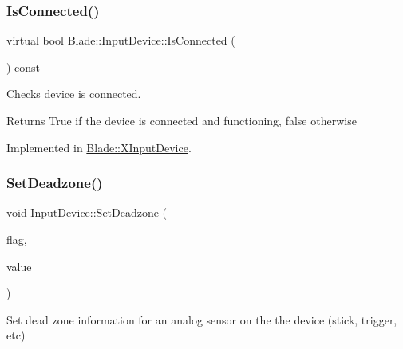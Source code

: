 \mbox{\label{class_blade_1_1_input_device_aa9cc6d93af07d3fb28db79f663752c4c}} 
\subsubsection{\texorpdfstring{Is\+Connected()}{IsConnected()}}
{\footnotesize\ttfamily virtual bool Blade\+::\+Input\+Device\+::\+Is\+Connected (\begin{DoxyParamCaption}{ }\end{DoxyParamCaption}) const\hspace{0.3cm}{\ttfamily [pure virtual]}}



Checks device is connected. 

\begin{DoxyReturn}{Returns}
True if the device is connected and functioning, false otherwise 
\end{DoxyReturn}


Implemented in \hyperlink{class_blade_1_1_x_input_device_a4eb3b23fabf556140c0ab14dd44a7009}{Blade\+::\+X\+Input\+Device}.

\mbox{\label{class_blade_1_1_input_device_a6bb50d40148c2bd07d1b979c4fed8adb}} 
\subsubsection{\texorpdfstring{Set\+Deadzone()}{SetDeadzone()}}
{\footnotesize\ttfamily void Input\+Device\+::\+Set\+Deadzone (\begin{DoxyParamCaption}\item[{Analog\+Deadzone}]{flag,  }\item[{float}]{value }\end{DoxyParamCaption})}



Set dead zone information for an analog sensor on the the device (stick, trigger, etc) 

